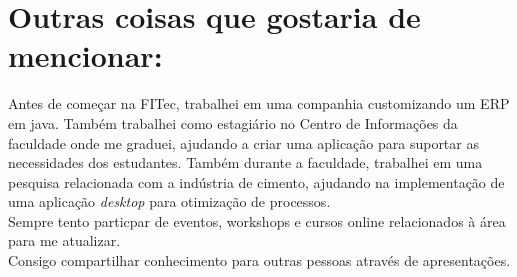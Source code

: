 \documentclass[]{friggeri-cv}
\begin{document}
\section{Outras coisas que gostaria de mencionar:}

Antes de começar na FITec, trabalhei em uma companhia customizando um ERP em java. Também trabalhei como estagiário no Centro de Informações da faculdade onde me graduei, ajudando a criar uma aplicação para suportar as necessidades dos estudantes. Também durante a faculdade, trabalhei em uma pesquisa relacionada com a indústria de cimento, ajudando na implementação de uma aplicação \textit{desktop} para otimização de processos.\\

Sempre tento particpar de eventos, workshops e cursos online relacionados à área para me atualizar. \\

Consigo compartilhar conhecimento para outras pessoas através de apresentações.\\
\end{document}
